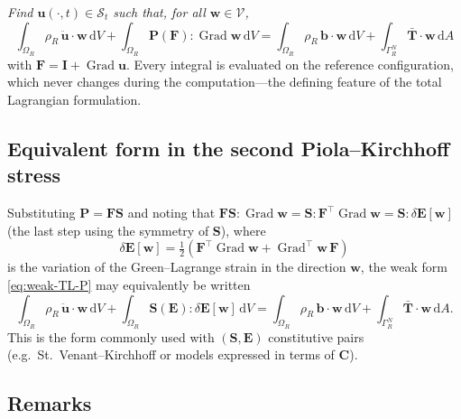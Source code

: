 \documentclass[11pt]{article}
\newcommand{\ud}{\,\mathrm{d}}
\newcommand{\Grad}{\operatorname{Grad}}     %
\newcommand{\bu}{\bm{u}}
\newcommand{\bb}{\bm{b}}
\newcommand{\bT}{\bm{T}}
\newcommand{\bw}{\bm{w}}
\newcommand{\bP}{\bm{P}}
\newcommand{\bS}{\bm{S}}
\newcommand{\bF}{\bm{F}}
\newcommand{\bC}{\bm{C}}
\newcommand{\bE}{\bm{E}}
\newcommand{\bI}{\bm{I}}
\begin{document}
\medskip
\noindent\emph{Find $\bu(\cdot,t) \in \mathcal{S}_t$ such that, for all
$\bw \in \mathcal{V}$,}
\begin{equation}
  \boxed{\;
  \int_{\Omega_R} \rho_R\, \ddot{\bu} \cdot \bw \ud V
  + \int_{\Omega_R} \bP(\bF) : \Grad \bw \ud V
  = \int_{\Omega_R} \rho_R\, \bb \cdot \bw \ud V
  + \int_{\Gamma_R^N} \bar{\bT} \cdot \bw \ud A
  \;}
  \label{eq:weak-TL-P}
\end{equation}
with $\bF = \bI + \Grad\bu$.  Every integral is evaluated on the reference
configuration, which never changes during the computation---the defining
feature of the total Lagrangian formulation.

\subsection{Equivalent form in the second Piola--Kirchhoff stress}

Substituting $\bP = \bF\bS$ and noting that
$\bF\bS : \Grad\bw = \bS : \bF^{\!\top}\Grad\bw = \bS : \delta\bE[\bw]$
(the last step using the symmetry of $\bS$), where
\begin{equation}
  \delta\bE[\bw]
  = \tfrac{1}{2}\left( \bF^{\!\top}\Grad\bw + \Grad^{\!\top}\bw\,\bF \right)
\end{equation}
is the variation of the Green--Lagrange strain in the direction $\bw$, the
weak form \eqref{eq:weak-TL-P} may equivalently be written
\begin{equation}
  \int_{\Omega_R} \rho_R\, \ddot{\bu} \cdot \bw \ud V
  + \int_{\Omega_R} \bS(\bE) : \delta\bE[\bw] \ud V
  = \int_{\Omega_R} \rho_R\, \bb \cdot \bw \ud V
  + \int_{\Gamma_R^N} \bar{\bT} \cdot \bw \ud A .
  \label{eq:weak-TL-S}
\end{equation}
This is the form commonly used with $(\bS,\bE)$ constitutive pairs
(e.g.\ St.~Venant--Kirchhoff or models expressed in terms of $\bC$).

\subsection{Remarks}
\end{document}

